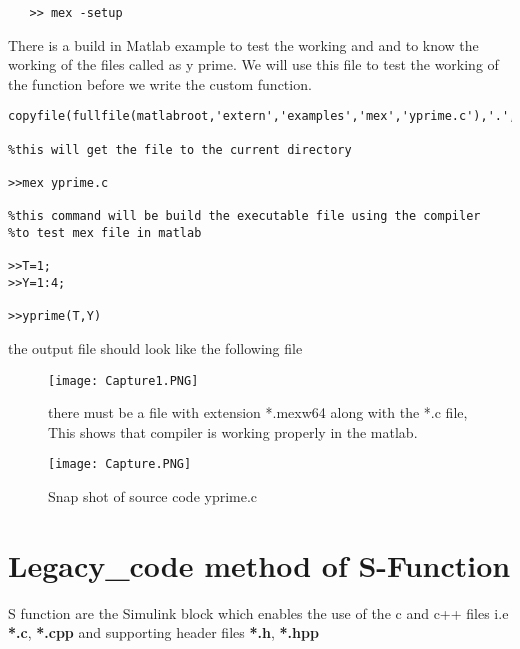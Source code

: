 \documentclass{article}
\begin{document}
\begin{verbatim}
   >> mex -setup
\end{verbatim}
There is a build in Matlab example to test the working and and to know the working of the files called as y prime. 
We will use this file to test the working of the function before we write the custom function.
\begin{verbatim}
copyfile(fullfile(matlabroot,'extern','examples','mex','yprime.c'),'.','f')

%this will get the file to the current directory

>>mex yprime.c

%this command will be build the executable file using the compiler
%to test mex file in matlab

>>T=1;
>>Y=1:4;

>>yprime(T,Y)
\end{verbatim}
the output file should look like the following file
\begin{figure}[h]
\centering
\texttt{[image: Capture1.PNG]}
\caption{there must be a file with extension *.mexw64 along with the *.c file, This shows that compiler is working properly in the matlab.}
\end{figure}
\begin{figure}[H]
    \centering
    \texttt{[image: Capture.PNG]}
    \caption{Snap shot of source code yprime.c}
    \label{fig:my_label}
\end{figure}
\section{Legacy\_code method of S-Function}
S function are the Simulink block which enables the use of the c and c++ files i.e \textbf{*.c}, \textbf{*.cpp} and supporting header files \textbf{*.h}, \textbf{*.hpp}
\end{document}
